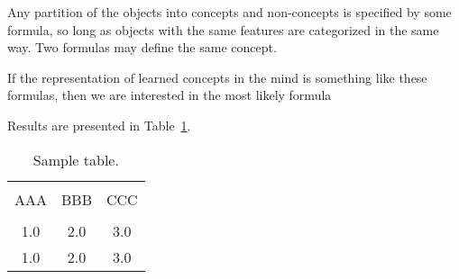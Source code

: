 \documentclass[jou,apacite]{apa6}
\begin{document}
Any partition of the objects into concepts and non-concepts
is specified by some formula, so long as objects with the same 
features are categorized in the same way. Two formulas may define the
same concept.

If the representation of learned concepts in the mind is
something like these formulas, then we are interested in the most
likely formula

Results are presented in Table~\ref{tab1}.
\begin{table}[!htb]
\caption{Sample table.}\label{tab1}
\begin{tabular}{ccc}
\hline\\[-1.5ex]
AAA & BBB & CCC \\[0.5ex]
\hline\\[-1.5ex]
1.0 & 2.0 & 3.0\\[0.5ex]
1.0 & 2.0 & 3.0\\[0.5ex]
\hline
\end{tabular}
\end{table}



\end{document}

